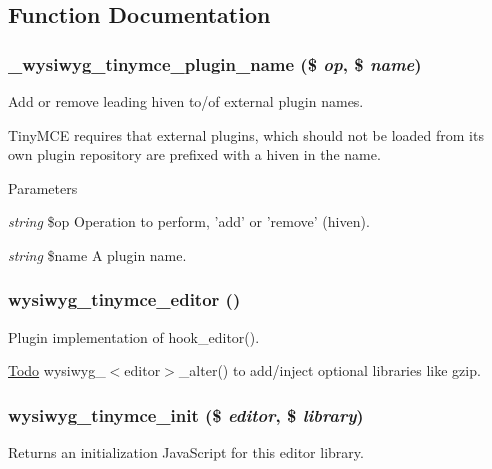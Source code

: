 \subsection{Function Documentation}
\hypertarget{tinymce_8inc_a180b1846fb5918efa67ce09059efb41e}{
\subsubsection[{\_\-wysiwyg\_\-tinymce\_\-plugin\_\-name}]{\setlength{\rightskip}{0pt plus 5cm}\_\-wysiwyg\_\-tinymce\_\-plugin\_\-name (\$ {\em op}, \/  \$ {\em name})}}
\label{tinymce_8inc_a180b1846fb5918efa67ce09059efb41e}
Add or remove leading hiven to/of external plugin names.

TinyMCE requires that external plugins, which should not be loaded from its own plugin repository are prefixed with a hiven in the name.


\begin{DoxyParams}{Parameters}
\item[{\em string}]\$op Operation to perform, 'add' or 'remove' (hiven). \item[{\em string}]\$name A plugin name. \end{DoxyParams}
\hypertarget{tinymce_8inc_a20ecffb8ac4c4df58bf2bcbada9dac13}{
\subsubsection[{wysiwyg\_\-tinymce\_\-editor}]{\setlength{\rightskip}{0pt plus 5cm}wysiwyg\_\-tinymce\_\-editor ()}}
\label{tinymce_8inc_a20ecffb8ac4c4df58bf2bcbada9dac13}
Plugin implementation of hook\_\-editor().

\begin{Desc}
\item[\hyperlink{todo__todo000062}{Todo}]wysiwyg\_\-$<$editor$>$\_\-alter() to add/inject optional libraries like gzip. \end{Desc}
\hypertarget{tinymce_8inc_a85d07084954b0a9d004e0491a07d424b}{
\subsubsection[{wysiwyg\_\-tinymce\_\-init}]{\setlength{\rightskip}{0pt plus 5cm}wysiwyg\_\-tinymce\_\-init (\$ {\em editor}, \/  \$ {\em library})}}
\label{tinymce_8inc_a85d07084954b0a9d004e0491a07d424b}
Returns an initialization JavaScript for this editor library.


